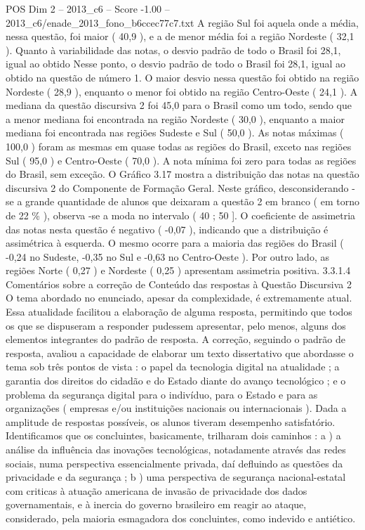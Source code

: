 \begin{textsample}{POS Dim 2 – 2013\_c6 – Score -1.00 – 2013\_c6/enade\_2013\_fono\_b6ccec77c7.txt}
A região Sul foi aquela onde a média, nessa questão, foi maior ( 40,9 ), e a de menor média foi a região Nordeste ( 32,1 ).
Quanto à variabilidade das notas, o desvio padrão de todo o Brasil foi 28,1, igual ao obtido Nesse ponto, o desvio padrão de todo o Brasil foi 28,1, igual ao obtido na questão de número 1.
O maior desvio nessa questão foi obtido na região Nordeste ( 28,9 ), enquanto o menor foi obtido na região Centro-Oeste ( 24,1 ).
A mediana da questão discursiva 2 foi 45,0 para o Brasil como um todo, sendo que a menor mediana foi encontrada na região Nordeste ( 30,0 ), enquanto a maior mediana foi encontrada nas regiões Sudeste e Sul ( 50,0 ).
As notas máximas ( 100,0 ) foram as mesmas em quase todas as regiões do Brasil, exceto nas regiões Sul ( 95,0 ) e Centro-Oeste ( 70,0 ).
A nota mínima foi zero para todas as regiões do Brasil, sem exceção.
O Gráfico 3.17 mostra a distribuição das notas na questão discursiva 2 do Componente de Formação Geral.
Neste gráfico, desconsiderando -se a grande quantidade de alunos que deixaram a questão 2 em branco ( em torno de 22 \% ), observa -se a moda no intervalo ( 40 ; 50 ].
O coeficiente de assimetria das notas nesta questão é negativo ( -0,07 ), indicando que a distribuição é assimétrica à esquerda.
O mesmo ocorre para a maioria das regiões do Brasil ( -0,24 no Sudeste, -0,35 no Sul e -0,63 no Centro-Oeste ).
Por outro lado, as regiões Norte ( 0,27 ) e Nordeste ( 0,25 ) apresentam assimetria positiva. 3.3.1.4 Comentários sobre a correção de Conteúdo das respostas à Questão Discursiva 2 O tema abordado no enunciado, apesar da complexidade, é extremamente atual.
Essa atualidade facilitou a elaboração de alguma resposta, permitindo que todos os que se dispuseram a responder pudessem apresentar, pelo menos, alguns dos elementos integrantes do padrão de resposta.
A correção, seguindo o padrão de resposta, avaliou a capacidade de elaborar um texto dissertativo que abordasse o tema sob três pontos de vista : o papel da tecnologia digital na atualidade ; a garantia dos direitos do cidadão e do Estado diante do avanço tecnológico ; e o problema da segurança digital para o indivíduo, para o Estado e para as organizações ( empresas e/ou instituições nacionais ou internacionais ).
Dada a amplitude de respostas possíveis, os alunos tiveram desempenho satisfatório.
Identificamos que os concluintes, basicamente, trilharam dois caminhos : a ) a análise da influência das inovações tecnológicas, notadamente através das redes sociais, numa perspectiva essencialmente privada, daí defluindo as questões da privacidade e da segurança ; b ) uma perspectiva de segurança nacional-estatal com criticas à atuação americana de invasão de privacidade dos dados governamentais, e à inercia do governo brasileiro em reagir ao ataque, considerado, pela maioria esmagadora dos concluintes, como indevido e antiético.

\end{textsample}
